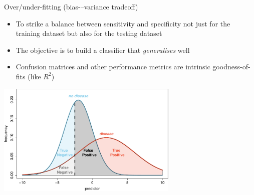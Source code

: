 \documentclass[pdf]{beamer}
\begin{document}
\begin{frame}{Over/under-fitting (bias-–variance tradeoff)}
\begin{itemize}\addtolength{\itemsep}{0.5\baselineskip}
\item To strike a balance between sensitivity and specificity not just for the training dataset but also for the testing dataset
\item The objective is to build a classifier that \textit{generalises} well
\item Confusion matrices and other performance metrics are intrinsic goodness-of-fits (like $R^2$)
\end{itemize}
\begin{center}
	\includegraphics[width=0.65\textwidth]{definitionsPlot.pdf}
\end{center}
\end{frame}
\end{document}
